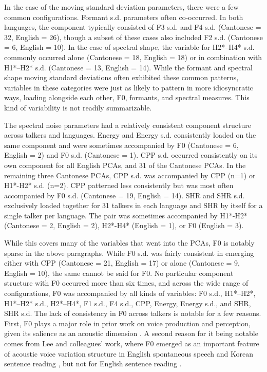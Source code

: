 In the case of the moving standard deviation parameters, there were a few common configurations. Formant s.d. parameters often co-occurred. In both languages, the component typically consisted of F3 s.d. and F4 s.d. (Cantonese = 32, English = 26), though a subset of these cases also included F2 s.d. (Cantonese = 6, English = 10). In the case of spectral shape, the variable for H2*--H4* s.d. commonly occurred alone (Cantonese = 18, English = 18) or in combination with H1*--H2* s.d. (Cantonese = 13, English = 14). While the formant and spectral shape moving standard deviations often exhibited these common patterns, variables in these categories were just as likely to pattern in more idiosyncratic ways, loading alongside each other, F0, formants, and spectral measures. This kind of variability is not readily summarizable. 

The spectral noise parameters had a relatively consistent component structure across talkers and languages. Energy and Energy s.d. consistently loaded on the same component and were sometimes accompanied by F0 (Cantonese = 6, English = 2) and F0 s.d. (Cantonese = 1). CPP s.d. occurred consistently on its own component for all English PCAs, and 31 of the Cantonese PCAs. In the remaining three Cantonese PCAs, CPP s.d. was accompanied by CPP (n=1) or H1*-H2* s.d. (n=2). CPP patterned less consistently but was most often accompanied by F0 s.d. (Cantonese = 19, English = 14). SHR and SHR s.d. exclusively loaded together for 31 talkers in each language and SHR by itself for a single talker per language. The pair was sometimes accompanied by H1*-H2* (Cantonese = 2, English = 2), H2*-H4* (English = 1), or F0 (English = 3). 

While this covers many of the variables that went into the PCAs, F0 is notably sparse in the above paragraphs. While F0 s.d. was fairly consistent in emerging either with CPP (Cantonese = 21, English = 17) or alone (Cantonese = 9, English = 10), the same cannot be said for F0. No particular component structure with F0 occurred more than six times, and across the wide range of configurations, F0 was accompanied by all kinds of variables: F0 s.d., H1*--H2*, H1*--H2* s.d., H2*--H4*, F1 s.d., F4 s.d., CPP, Energy, Energy s.d., and SHR, SHR s.d. The lack of consistency in F0 across talkers is notable for a few reasons. First, F0 plays a major role in prior work on voice production and perception, given its salience as an acoustic dimension \citep{perrachione_2019_judgments}. A second reason for it being notable comes from Lee and colleagues' work, where F0 emerged as an important feature of acoustic voice variation structure in English spontaneous speech \citep{lee_2019_spontaneous} and Korean sentence reading \citep{lee_2020_language}, but not for English sentence reading \citep{lee_2019_acoustic}. 

